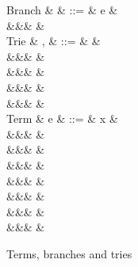 \begin{figure}[H]
\begin{syntaxfig}
\mbox{Branch}
&
\kappa
&
::=
&
e
&
\\
&&&
\sigma
&
\\[2mm]
\mbox{Trie}
&
\sigma, \tau
&
::=
&
&
\\
&&&
\trieUnit{\kappa}
&
\\
&&&
\trieSum{\sigma}{\tau}
&
\\
&&&
\trieProd{\sigma}
&
\\
&&&
\trieRoll{\sigma}
&
\\[2mm]
\mbox{Term}
&
e
&
::=
&
x
&
\\
&&&
\exUnit
&
\\
&&&
&
\\
&&&
&
\\
&&&
&
\\
&&&
\exFun{\sigma}
&
\\
&&&
&
\\
&&&
&
\end{syntaxfig}
\caption{Terms, branches and tries}
\end{figure}
